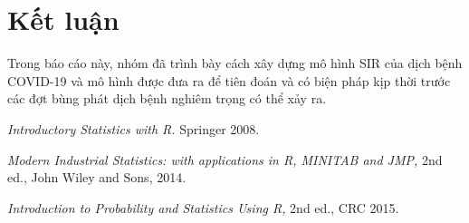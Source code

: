 \documentclass[a4paper]{article}
\begin{document}
\section{Kết luận}
Trong báo cáo này, nhóm đã trình bày cách xây dựng mô hình SIR của dịch bệnh COVID-19 và mô hình được đưa ra để tiên đoán và có biện pháp kịp thời trước các đợt bùng phát dịch bệnh nghiêm trọng có thể xảy ra.


\begin{thebibliography}{99999}
 {\em Introductory Statistics with R.}  Springer 2008.

{\em Modern Industrial Statistics: with applications in R, MINITAB and JMP,} 2nd ed.,  John Wiley and Sons, 2014.

{\em Introduction to Probability and Statistics Using R,} 2nd ed., CRC 2015.


\end{thebibliography}
\end{document}
